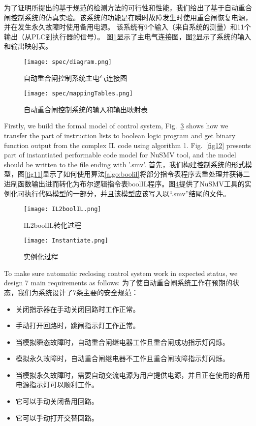 为了证明所提出的基于规范的检测方法的可行性和性能，我们给出了基于自动重合闸控制系统的仿真实验。该系统的功能是在瞬时故障发生时使用重合闸恢复电源，并在发生永久故障时使用备用电源。 该系统有9个输入（来自系统的测量）和11个输出（从PLC到执行器的信号）。 图\ref {fig29}显示了主电气连接图，图\ref {fig210}显示了系统的输入和输出映射表。

\begin{figure}[!htb]
\centering
\texttt{[image: spec/diagram.png]}
\caption{自动重合闸控制系统主电气连接图}
\label{fig29}
\end{figure}

\begin{figure}[!htb]
\centering
\texttt{[image: spec/mappingTables.png]}
\caption{自动重合闸控制系统的输入和输出映射表}
\label{fig210}
\end{figure}

Firstly, we build the formal model of control system, Fig.~\ref{fig211} shows how we transfer the part of instruction lists to boolean logic program and get binary function output from the complex IL code using algorithm 1. Fig.~\ref{fig12} presents part of instantiated performable code model for NuSMV tool, and the model should be written to the file ending with '.smv'.
首先，我们构建控制系统的形式模型，图\ref {fig11}显示了如何使用算法\ref{algo:boolil}将部分指令表程序去重处理并获得二进制函数输出进而转化为布尔逻辑指令表boolIL程序。图\ref {fig212}提供了NuSMV工具的实例化可执行代码模型的一部分，并且该模型应该写入以“.smv”结尾的文件。
\begin{figure}[!htb]{}
\centering
\texttt{[image: IL2boolIL.png]}
\caption{IL2boolIL转化过程}
\label{fig211}
\end{figure}

\begin{figure}[!htb]
\centering
\texttt{[image: Instantiate.png]}
\caption{实例化过程}
\label{fig212}
\end{figure}
To make sure automatic reclosing control system work in expected status, we design 7 main requirements as follows:
为了使自动重合闸系统工作在预期的状态，我们为系统设计了7条主要的安全规范：
\begin{itemize}
	\item 关闭指示器在手动关闭回路时工作正常。
	\item 手动打开回路时，跳闸指示灯工作正常。
	\item 当模拟瞬态故障时，自动重合闸继电器工作且重合闸成功指示灯闪烁。
	\item 模拟永久故障时，自动重合闸继电器不工作且重合闸故障指示灯闪烁。
	\item 当模拟永久故障时，需要自动交流电源为用户提供电源，并且正在使用的备用电源指示灯可以顺利工作。
	\item 它可以手动关闭备用回路。
	\item 它可以手动打开交替回路。
\end{itemize}

